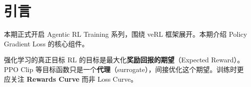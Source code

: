 \section{引言}
本期正式开启 Agentic RL Training 系列，围绕 veRL 框架展开。本期介绍 Policy Gradient Loss 的核心组件。

\begin{importantbox}{强化学习的真正目标}
RL 的目标是最大化\textbf{奖励回报的期望}（Expected Reward）。PPO Clip 等目标函数只是一个\textbf{代理}（surrogate），间接优化这个期望。训练时更应关注 \textbf{Rewards Curve} 而非 Loss Curve。
\end{importantbox}

